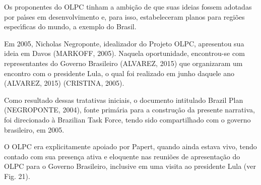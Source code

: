 \documentclass[
12pt,		%
openright,	%
twoside,  %
a4paper,			%
chapter=TITLE,		%
english,			%
french,				%
spanish,			%
brazil				%
]{USPSC-classe/USPSC}
\begin{document}
Os proponentes do OLPC tinham a ambi\c{c}\~ao de que suas ideias fossem adotadas por pa\'{\i}ses em desenvolvimento e, para isso, estabeleceram planos para regi\~oes espec\'{\i}ficas do mundo, a exemplo do Brasil.

















Em 2005, Nicholas Negroponte, idealizador do Projeto OLPC, apresentou sua ideia em Davos (MARKOFF, 2005). Naquela oportunidade, encontrou-se com representantes do Governo Brasileiro (ALVAREZ, 2015) que organizaram um encontro com o presidente Lula, o qual foi realizado em junho daquele ano (ALVAREZ, 2015) (CRISTINA, 2005).

















Como resultado dessas tratativas iniciais, o documento intitulado \textquotedbl Brazil Plan \textquotedbl   (NEGROPONTE, 2004), fonte prim\'aria para a constru\c{c}\~ao da presente narrativa, foi direcionado \`a \textquotedbl Brazilian Task Force\textquotedbl , tendo sido compartilhado com o governo brasileiro, em 2005.

















O OLPC era explicitamente apoiado por Papert, quando ainda estava vivo, tendo contado com sua presen\c{c}a ativa e eloquente nas reuni\~oes de apresenta\c{c}\~ao do OLPC para o Governo Brasileiro, inclusive em uma visita ao presidente Lula (ver Fig. 21).
\end{document}
